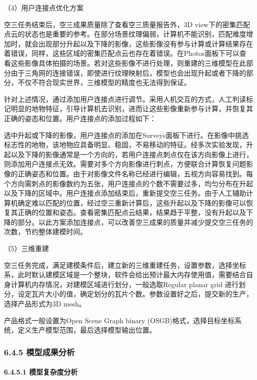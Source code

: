 （4）用户连接点优化方案

空三任务结束后，空三成果质量除了查看空三质量报告外，3D view下的密集匹配点云的状态也是重要的参考。在部分场景纹理偏弱，计算机不能识别，匹配难度增加时，就会出现部分升起以及下降的影像，这些影像没有参与计算或计算结果存在着错误，同样，这些区域的密集匹配点云也存在着错误。在Photos面板下可以查看这些影像具体拍摄的场景。若对这些影像不进行处理，则重建的三维模型在此部分由于三角网的连接错误，即使进行纹理映射后，模型也会出现升起或者下降的部分，不仅不符合现实世界，三维模型的精度也无法得到保证。

针对上述情况，通过添加用户连接点进行调节。采用人机交互的方式，人工判读标记明显的地物特征，引导计算机去识别，进而让这些影像重新参与计算，并恢复其正确的姿态和位置。用户连接点的添加过程如下：

选中升起或下降的影像，用户连接点的添加在Surveys面板下进行。在影像中挑选标志性的地物，该地物应具备明显、稳固，不易移动的特征。经多次实验发现，升起以及下降的影像通常是一个方向的，若用户连接点刺点仅在该方向影像上进行，则添加用户连接点无效。需要对多个方向影像进行刺点，方便联合计算恢复问题影像的正确姿态和位置。由于对影像文件名称已经进行编辑，五视方向容易找到。每个方向需刺点的影像数约为五张，用户连接点的个数不需要过多，均匀分布在升起以及下降的区域中。用户连接点添加结束后，重新提交空三任务。由于人工辅助计算机确定难以匹配的位置，经过空三重新计算后，这些升起以及下降的影像可以恢复其正确的位置和姿态。查看密集匹配点云结果，结果趋于平整，没有升起以及下降的部分。以此方案添加连接点，可以改善空三成果的质量并减少提交空三任务的次数，节约整体建模时间。

（5）三维重建

空三任务完成，满足建模条件后，建立新的三维重建任务，设置参数，选择坐标系，此时默认建模区域是一个整块，软件会给出预计最大内存使用值，需要结合自身计算机内存情况，对建模区域进行划分，一般选取Regular planar grid 进行划分，设定瓦片大小的值，确定划分的瓦片个数。参数设置好之后，提交新的生产，选择产品形式为3D mesh。

产品格式一般设置为Open Scene Graph binary (OSGB)格式，选择目标坐标系统，定义生产模型范围，最后选择模型输出位置。

\subsubsection{6.4.5 模型成果分析}\label{ux6a21ux578bux6210ux679cux5206ux6790}

\paragraph{6.4.5.1 模型复杂度分析}\label{ux6a21ux578bux590dux6742ux5ea6ux5206ux6790}


